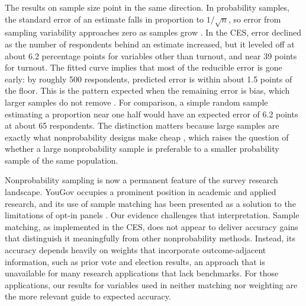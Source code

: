 \documentclass[12pt]{article}
\begin{document}
The results on sample size point in the same direction. In probability samples, the standard error of an estimate falls in proportion to $1/\sqrt{n}$, so error from sampling variability approaches zero as samples grow \parencite{cochran_sampling_1977}. In the CES, error declined as the number of respondents behind an estimate increased, but it leveled off at about 6.2 percentage points for variables other than turnout, and near 39 points for turnout. The fitted curve implies that most of the reducible error is gone early: by roughly 500 respondents, predicted error is within about 1.5 points of the floor. This is the pattern expected when the remaining error is bias, which larger samples do not remove \parencite{meng_statistical_2018, bethlehem_selection_2010}. For comparison, a simple random sample estimating a proportion near one half would have an expected error of 6.2 points at about 65 respondents. The distinction matters because large samples are exactly what nonprobability designs make cheap \parencite{baker_report_2013}, which raises the question of whether a large nonprobability sample is preferable to a smaller probability sample of the same population.

Nonprobability sampling is now a permanent feature of the survey research landscape. YouGov occupies a prominent position in academic and applied research, and its use of sample matching has been presented as a solution to the limitations of opt-in panels \parencite{rivers_sampling_2007, crampton_about_2007}. Our evidence challenges that interpretation. Sample matching, as implemented in the CES, does not appear to deliver accuracy gains that distinguish it meaningfully from other nonprobability methods. Instead, its accuracy depends heavily on weights that incorporate outcome-adjacent information, such as prior vote and election results, an approach that is unavailable for many research applications that lack benchmarks. For those applications, our results for variables used in neither matching nor weighting are the more relevant guide to expected accuracy.
\end{document}
